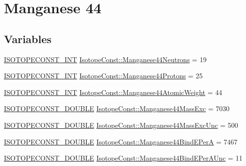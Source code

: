 \hypertarget{group___isotope_const-_manganese-_mn44}{}\section{Manganese 44}
\label{group___isotope_const-_manganese-_mn44}
\subsection*{Variables}
\begin{DoxyCompactItemize}
\item 
\mbox{\hyperlink{group___isotope_const-_macros_ga5f18360b3e99483a35c32d789e62621c}{I\+S\+O\+T\+O\+P\+E\+C\+O\+N\+S\+T\+\_\+\+I\+NT}} \mbox{\hyperlink{group___isotope_const-_manganese-_mn44_ga126ec899ce09d9805a9a1094055109e6}{Isotope\+Const\+::\+Manganese44\+Neutrons}} = 19
\item 
\mbox{\hyperlink{group___isotope_const-_macros_ga5f18360b3e99483a35c32d789e62621c}{I\+S\+O\+T\+O\+P\+E\+C\+O\+N\+S\+T\+\_\+\+I\+NT}} \mbox{\hyperlink{group___isotope_const-_manganese-_mn44_ga535742b8b76d93d78e84b036849c24e7}{Isotope\+Const\+::\+Manganese44\+Protons}} = 25
\item 
\mbox{\hyperlink{group___isotope_const-_macros_ga5f18360b3e99483a35c32d789e62621c}{I\+S\+O\+T\+O\+P\+E\+C\+O\+N\+S\+T\+\_\+\+I\+NT}} \mbox{\hyperlink{group___isotope_const-_manganese-_mn44_gacaa184153ea22dafe54a68f2df14e8d7}{Isotope\+Const\+::\+Manganese44\+Atomic\+Weight}} = 44
\item 
\mbox{\hyperlink{group___isotope_const-_macros_ga8f45a7272ce02c0b4c65c44636ed719a}{I\+S\+O\+T\+O\+P\+E\+C\+O\+N\+S\+T\+\_\+\+D\+O\+U\+B\+LE}} \mbox{\hyperlink{group___isotope_const-_manganese-_mn44_gac8743dd6fab402e531d4abf845dc8dc0}{Isotope\+Const\+::\+Manganese44\+Mass\+Exc}} = 7030
\item 
\mbox{\hyperlink{group___isotope_const-_macros_ga8f45a7272ce02c0b4c65c44636ed719a}{I\+S\+O\+T\+O\+P\+E\+C\+O\+N\+S\+T\+\_\+\+D\+O\+U\+B\+LE}} \mbox{\hyperlink{group___isotope_const-_manganese-_mn44_ga6921fca02e10ad76596446697c5c2e67}{Isotope\+Const\+::\+Manganese44\+Mass\+Exc\+Unc}} = 500
\item 
\mbox{\hyperlink{group___isotope_const-_macros_ga8f45a7272ce02c0b4c65c44636ed719a}{I\+S\+O\+T\+O\+P\+E\+C\+O\+N\+S\+T\+\_\+\+D\+O\+U\+B\+LE}} \mbox{\hyperlink{group___isotope_const-_manganese-_mn44_ga4a05b296a784d0d180a8c6f15989e957}{Isotope\+Const\+::\+Manganese44\+Bind\+E\+PerA}} = 7467
\item 
\mbox{\hyperlink{group___isotope_const-_macros_ga8f45a7272ce02c0b4c65c44636ed719a}{I\+S\+O\+T\+O\+P\+E\+C\+O\+N\+S\+T\+\_\+\+D\+O\+U\+B\+LE}} \mbox{\hyperlink{group___isotope_const-_manganese-_mn44_ga92853712bb9d2d9d7efb8772261d764c}{Isotope\+Const\+::\+Manganese44\+Bind\+E\+Per\+A\+Unc}} = 11

\end{DoxyCompactItemize}
